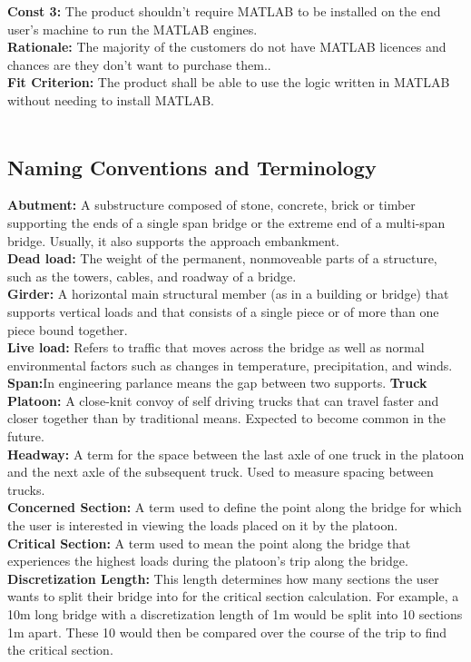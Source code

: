 \documentclass[12pt]{article}
\begin{document}
    \textbf{Const 3:} The product shouldn't require MATLAB to be installed on the end user’s machine to run the MATLAB engines. \\
    \textbf{Rationale:} The majority of the customers do not have MATLAB licences and chances are they don’t want to purchase them..\\
    \textbf{Fit Criterion:} The product shall be able to use the logic written in MATLAB without needing to install MATLAB.\\\\

\subsection{Naming Conventions and Terminology}
\textbf{Abutment:} A substructure composed of stone, concrete, brick or timber supporting the ends of a single span bridge or the extreme end of a multi-span bridge. Usually, it also supports the approach embankment.\\
\textbf{Dead load:} The weight of the permanent, nonmoveable parts of a structure, such as the towers, cables, and roadway of a bridge.\\
\textbf{Girder:} A horizontal main structural member (as in a building or bridge) that supports vertical loads and that consists of a single piece or of more than one piece bound together.\\
\textbf{Live load:} Refers to traffic that moves across the bridge as well as normal environmental factors such as changes in temperature, precipitation, and winds.\\
\textbf{Span:}In engineering parlance means the gap between two supports.
\textbf{Truck Platoon:} A close-knit convoy of self driving trucks that can travel faster and closer together than by traditional means. Expected to become common in the future.\\
\textbf{Headway:} A term for the space between the last axle of one truck in the platoon and the next axle of the subsequent truck. Used to measure spacing between trucks.\\
\textbf{Concerned Section:} A term used to define the point along the bridge for which the user is interested in viewing the loads placed on it by the platoon.\\
\textbf{Critical Section:} A term used to mean the point along the bridge that experiences the highest loads during the platoon's trip along the bridge.\\
\textbf{Discretization Length:} This length determines how many sections the user wants to split their bridge into for the critical section calculation. For example,
a 10m long bridge with a discretization length of 1m would be split into 10 sections 1m apart. These 10 would then be compared over the course of the trip to find the critical
section.\\  
\end{document}
